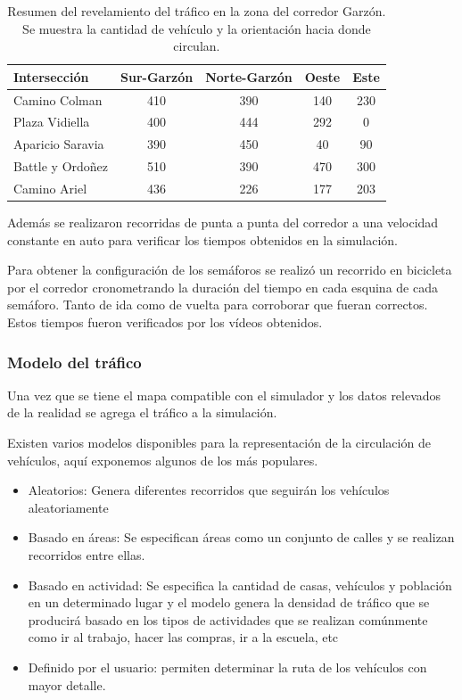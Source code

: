 \begin{table}[h]
	\renewcommand{\arraystretch}{1.2}
	\caption{Resumen del revelamiento del tráfico en la zona del corredor Garzón. Se muestra la cantidad de vehículo y la orientación hacia donde circulan.}
	\label{table:resumen_trafico}
	\centering
	\begin{tabular}{lcccc}
		\hline
		Intersección&
		Sur-Garzón& 
		Norte-Garzón & 
		Oeste &
		Este 
		\\ 
		\hline
		Camino Colman  & 410 & 390 & 140 & 230\\		
		Plaza Vidiella  & 400 & 444 & 292 & 0\\		
		Aparicio Saravia  & 390 & 450 & 40 & 90\\		
		Battle y Ordoñez  & 510 & 390 & 470 & 300 \\	
		Camino Ariel  & 436 & 226 & 177 & 203 \\													
		\hline
		
		
		\hline
	\end{tabular}
\end{table}


Además se realizaron recorridas de punta a punta del corredor a una velocidad constante en auto para verificar los tiempos obtenidos en la simulación.

Para obtener la configuración de los semáforos se realizó un recorrido en bicicleta por el corredor cronometrando la duración del tiempo en cada esquina de cada semáforo. Tanto de ida como de vuelta para corroborar que fueran correctos. Estos tiempos fueron verificados por los vídeos obtenidos.


\newpage
\subsubsection{Modelo del tráfico}
Una vez que se tiene el mapa compatible con el simulador y los datos relevados de la realidad se agrega el tráfico a la simulación.

Existen varios modelos disponibles para la representación de la circulación de vehículos, aquí exponemos algunos de los más populares. 
\begin{itemize}
	\item Aleatorios: Genera diferentes recorridos que seguirán los vehículos aleatoriamente
	\item Basado en áreas:  Se especifican áreas como un conjunto de calles y se realizan recorridos entre ellas.
	\item Basado en actividad: Se especifica la cantidad de casas, vehículos y población en un determinado lugar y el modelo genera la densidad de tráfico que se producirá basado en los tipos de actividades que se realizan comúnmente como ir al trabajo, hacer las compras, ir a la escuela,  etc
	\item Definido por el usuario: permiten determinar la ruta de los vehículos con mayor detalle.
\end{itemize}


